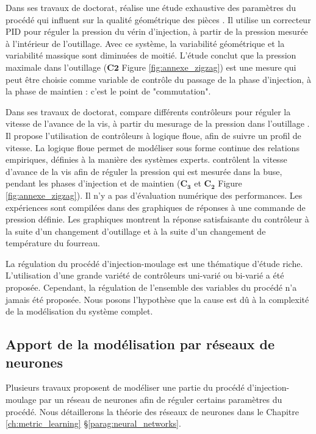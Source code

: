 Dans ses travaux de doctorat, \citeauthor{devos_contribution_1990} réalise une étude exhaustive des paramètres du procédé qui influent sur la qualité géométrique des pièces \cite{devos_contribution_1990}.
Il utilise un correcteur PID pour réguler la pression du vérin d’injection, à partir de la pression mesurée à l'intérieur de l'outillage.
Avec ce système, la variabilité géométrique et la variabilité massique sont diminuées de moitié.
L'étude conclut que la pression maximale dans l'outillage ($\boldsymbol{C2}$ Figure \ref{fig:annexe_zigzag}) est une mesure qui peut être choisie comme variable de contrôle du passage de la phase d’injection, à la phase de maintien : c'est le point de "commutation".

Dans ses travaux de doctorat, \citeauthor{tsoi_fuzzy_1997} compare différents contrôleurs pour réguler la vitesse de l'avance de la vis, à partir du mesurage de la pression dans l'outillage \cite{tsoi_fuzzy_1997}.
Il propose l'utilisation de contrôleurs à logique floue, afin de suivre un profil de vitesse.
La logique floue permet de modéliser sous forme continue des relations empiriques, définies à la manière des systèmes experts.
\citeauthor{huang_fuzzy_2000} \cite{huang_fuzzy_2000} contrôlent la vitesse d’avance de la vis afin de réguler la pression qui est mesurée dans la buse, pendant les phases d’injection et de maintien ($\boldsymbol{C_3}$ et $\boldsymbol{C_2}$ Figure \ref{fig:annexe_zigzag}).  %
Il n'y a pas d’évaluation numérique des performances.
Les expériences sont compilées dans des graphiques de réponses à une commande de pression définie.
Les graphiques montrent la réponse satisfaisante du contrôleur à la suite d'un changement d'outillage et à la suite d'un changement de température du fourreau.

La régulation du procédé d'injection-moulage est une thématique d'étude riche.
L'utilisation d'une grande variété de contrôleurs uni-varié ou bi-varié a été proposée.
Cependant, la régulation de l'ensemble des variables du procédé n'a jamais été proposée.
Nous posons l'hypothèse que la cause est dû à la complexité de la modélisation du système complet.

\subsection{Apport de la modélisation par réseaux de neurones} \label{parag:neural}
Plusieurs travaux proposent de modéliser une partie du procédé d'injection-moulage par un réseau de neurones afin de réguler certains paramètres du procédé.
Nous détaillerons la théorie des réseaux de neurones dans le Chapitre \ref{ch:metric_learning} §\ref{parag:neural_networks}.


